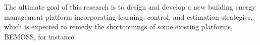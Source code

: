 
The ultimate goal of this research is to design and develop a new building energy management
platform incorporating learning, control, and estimation strategies, which is expected to remedy the
shortcomings of some existing platforms, BEMOSS, for instance.

